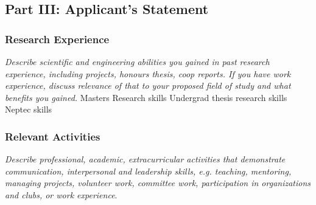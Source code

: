 \documentclass[a4paper,12pt]{article}
\begin{document}
\subsection*{Part III: Applicant's Statement}
\subsubsection*{Research Experience}
\textit{Describe scientific and engineering abilities you gained in past
    research experience, including projects, honours thesis, coop reports. If
    you have work experience, discuss relevance of that to your proposed field
of study and what benefits you gained.}
Masters Research skills
Undergrad thesis research skills
Neptec skills

\subsubsection*{Relevant Activities}
\textit{Describe professional, academic, extracurricular activities that
    demonstrate communication, interpersonal and leadership skills, e.g.
    teaching, mentoring, managing projects, volunteer work, committee work,
participation in organizations and clubs, or work experience}.
\end{document}
